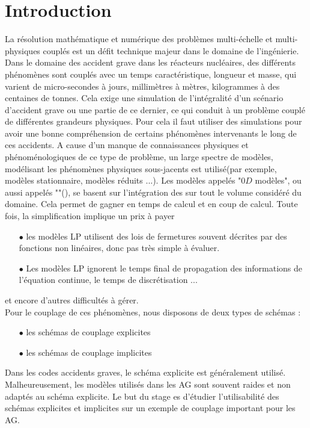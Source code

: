 \documentclass[11pt,a4paper]{scrartcl}%
\begin{document}
	\section{Introduction}
	La résolution mathématique et numérique des problèmes multi-échelle et multi-physiques couplés est un défit technique majeur dans le domaine de l'ingénierie. Dans le domaine des accident grave dans les réacteurs nucléaires, des différents phénomènes sont couplés avec un temps caractéristique, longueur et masse, qui varient de micro-secondes à jours, millimètres à mètres, kilogrammes à des centaines de tonnes. Cela exige une simulation de l'intégralité d'un scénario d'accident grave ou  une partie de ce dernier, ce qui conduit à un problème couplé de différentes grandeurs physiques. Pour cela il faut utiliser des simulations pour avoir une bonne compréhension de certains phénomènes intervenants le long de ces accidents. A cause d'un manque de connaissances physiques et phénoménologiques de ce type de problème, un large spectre de modèles, modélisant les phénomènes physiques sous-jacents est utilisé(par exemple, modèles stationnaire, modèles réduits ...). Les modèles appelés "$0D$ modèles", ou aussi appelés ""(), se basent sur l'intégration des  sur tout le volume considéré du domaine. Cela permet de gagner en temps de calcul et en coup de calcul. Toute fois, la simplification implique un prix à payer
	\begin{itemize}
		\item [$\bullet$] les modèles LP utilisent des lois de fermetures souvent décrites par des fonctions non linéaires, donc pas très simple à évaluer.
		\item [$\bullet$] Les modèles LP ignorent le temps final de propagation des informations de l'équation continue, le temps de discrétisation ...
	\end{itemize}     
	et encore d'autres difficultés à gérer.\\
	Pour le couplage de ces phénomènes, nous disposons de deux types de schémas : 
	\begin{itemize}
		\item [$\bullet$] les schémas de couplage explicites
		\item[$\bullet$] les schémas de couplage implicites
	\end{itemize}
	Dans les codes accidents graves, le schéma explicite est généralement utilisé. Malheureusement, les modèles utilisés dans les AG sont souvent raides et non adaptés au schéma
	explicite. Le but du stage es d’étudier l’utilisabilité des schémas explicites et implicites sur un exemple de couplage important pour les AG.\\
\end{document}
